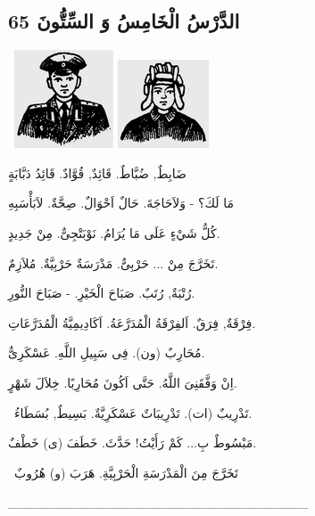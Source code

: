 \documentclass[a5paper]{article}
\begin{document}
\subsection[الدَّرْسُ الْخَامِسُ وَ السِّتُّونَ 65 ]{الدَّرْسُ الْخَامِسُ وَ السِّتُّونَ 65 }
\  \includegraphics[width=1.1563in,height=1.1457in]{MuhammadBagauddinlatinized-img216.png}   \includegraphics[width=1.0626in,height=1.0311in]{MuhammadBagauddinlatinized-img217.png} 

ضَابِطٌ, ضُبَّاطٌ. قَائِدٌ, قُوَّادٌ. قَائِدُ دَبَّابَةٍ

مَا لَكَ؟ - وَلاَحَاجَةَ. حَالٌ اَحْوَالٌ. صِحَّةٌ. لاَبَأْسَبِهِ

كُلُّ شَيْءٍ عَلَى مَا يُرَامُ. نَوْبَتْجِىٌّ. مِنْ جَدِيدٍ.

تَخَرَّجَ مِنْ ... حَرْبِىٌّ. مَدْرَسَةٌ حَرْبِيَّةٌ. مُلاَزِمٌ.

رُتْبَةٌ, رُتَبٌ. صَبَاحَ الْخَيْرِ. - صَبَاحَ النُّورِ. 

فِرْقَةٌ, فِرَقٌ. اَلفِرْقَةُ الْمُدَرَّعَةُ. اَكَادِيمِيَّةُ الْمُدَرَّعَاتِ.

مُحَارِبٌ (ون). فِى سَبِيلِ اللَّهِ. عَسْكَرِىٌّ. 

اِنْ وَفَّقَنِىَ اللَّهُ. حَتَّى اَكُونَ مُحَارِبًا. خِلاَلَ شَهْرٍ.

\ تَدْرِيبٌ (ات). تَدْرِيبَاتٌ عَسْكَرِيَّةٌ. بَسِيطٌ, بُسَطَاءُ.

مَبْسُوطٌ بِ... كَمْ رَأَيْتُ! حَدَّثَ. خَطَفَ (ى) خَطْفٌ.

\ تَخَرَّجَ مِنَ الْمَدْرَسَةِ الْحَرْبِيَّةِ. هَرَبَ (و) هُرُوبٌ

\_\_\_\_\_\_\_\_\_\_\_\_\_\_\_\_\_\_\_\_\_\_\_\_\_\_\_\_\_\_\_\_
\end{document}
